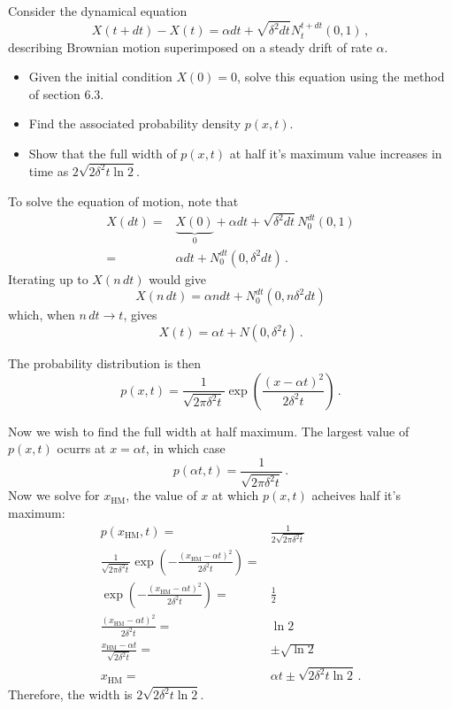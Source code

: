 

Consider the dynamical equation
\begin{equation*}
  X(t + dt) - X(t) = \alpha dt + \sqrt{\delta^2 dt}N_t^{t+dt}(0, 1) \, ,
\end{equation*}
describing Brownian motion superimposed on a steady drift of rate $\alpha$.
\begin{itemize}
  \item Given the initial condition $X(0)=0$, solve this equation using the method of section 6.3.
  \item Find the associated probability density $p(x, t)$.
  \item Show that the full width of $p(x, t)$ at half it's maximum value increases in time as $2 \sqrt{2 \delta^2 t \ln 2}$.
\end{itemize}


To solve the equation of motion, note that
\begin{align*}
  X(dt)
  =& \underbrace{X(0)}_0 + \alpha dt + \sqrt{\delta^2 dt}N_0^{dt}(0, 1) \\
  =& \alpha dt + N_0^{dt}(0, \delta^2 dt) \, .
\end{align*}
Iterating up to $X(n \, dt)$ would give
\begin{equation*}
  X(n\, dt) = \alpha n dt + N_0^{dt}(0, n \delta^2 dt)
\end{equation*}
which, when $n \, dt \rightarrow t$, gives
\begin{equation*}
  X(t) = \alpha t + N(0, \delta^2 t) \, .
\end{equation*}

The probability distribution is then
\begin{equation*}
  p(x, t) = \frac{1}{\sqrt{2\pi \delta^2 t}}
    \exp \left( \frac{(x - \alpha t)^2}{2 \delta^2 t} \right) \, .
\end{equation*}

Now we wish to find the full width at half maximum.
The largest value of $p(x, t)$ ocurrs at $x = \alpha t$, in which case
\begin{equation*}
  p(\alpha t, t) = \frac{1}{\sqrt{2 \pi \delta^2 t }}\, .
\end{equation*}
Now we solve for $x_\text{HM}$, the value of $x$ at which $p(x, t)$ acheives half it's maximum:
\begin{align*}
  p(x_\text{HM}, t) =& \frac{1}{2\sqrt{2 \pi \delta^2 t}} \\
  \frac{1}{\sqrt{2 \pi \delta^2 t}} \exp \left(-\frac{(x_\text{HM} - \alpha t)^2}{2 \delta^2 t} \right)
  =& \\
  \exp \left(-\frac{(x_\text{HM}-\alpha t)^2}{2 \delta^2 t} \right) =& \frac{1}{2} \\
  \frac{(x_\text{HM} - \alpha t)^2}{2 \delta^2 t} =& \ln 2 \\
  \frac{x_\text{HM} - \alpha t}{\sqrt{2 \delta^2 t}} =& \pm \sqrt{\ln 2} \\
  x_\text{HM} =& \alpha t \pm \sqrt{2 \delta^2 t \ln 2} \, .
\end{align*}
Therefore, the width is $2 \sqrt{2 \delta^2 t \ln 2}$.


